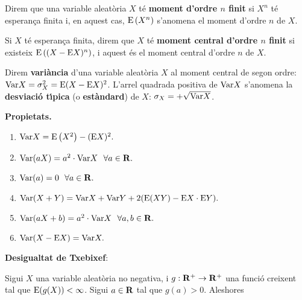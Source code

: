 \begin{defin}
Direm que una variable aleat\`oria $X$ t\'e {\bf moment d'ordre $n$
finit}
si $X^n$ t\'e esperan\c ca finita i, en aquest cas, ${\rm E}\left(X^n\right)$ s'anomena el moment
d'ordre $n$ de $X$.
\end{defin}

\begin{defin}
Si $X$ t\'e esperan\c ca finita, direm que $X$ t\'e {\bf moment central
d'ordre $n$ finit} si existeix 
${\rm E}\left( (X -{\rm E} X)^n\right)$, i aquest \'es el moment central d'ordre $n$ de $X$.
\end{defin}

\begin{defin}
Direm {\bf vari\`ancia} d'una variable aleat\`oria
$X$ al moment central de segon ordre: ${\rm Var} X = \sigma_X^2 ={\rm E} (X -{\rm E} X)^2$.
L'arrel quadrada positiva
de ${\rm Var} X$ s'anomena la {\bf desviaci\'o t\'{\i}pica}
(o {\bf est\`andard}) de
$X$: $\sigma_X = + \sqrt{{\rm Var} X}$.
\end{defin}

\newpage

{\bf Propietats.}

\begin{enumerate}

\item ${\rm Var} X = {\rm E}\left(X^2\right) - ({\rm E} X)^2.$

\item $\Var (aX) = a^2 \cdot \Var X \ \ \forall a \in \RR.$

\item ${\rm Var} (a) = 0 \ \ \forall a \in {\bf R}.$

\item ${\rm Var} (X + Y) = {\rm Var} X + {\rm Var} Y + 2 ({\rm E} (XY) -{\rm E} X \cdot{\rm E} Y).$

\item $\Var (aX + b) = a^2 \cdot \Var X \ \ \forall a,b \in \RR.$

\item ${\rm Var} (X -{\rm E} X) = {\rm Var} X.$

\end{enumerate}

{\bf Desigualtat de Txebixef}:

Sigui $X$ una variable aleat\`oria no negativa, i $g : {\bf R}^+ \to {\bf R}^+$
una funci\'o creixent tal que ${\rm E} (g(X)) < \infty$. Sigui $a \in {\bf R}$ tal que 
$g(a) > 0$. Aleshores

